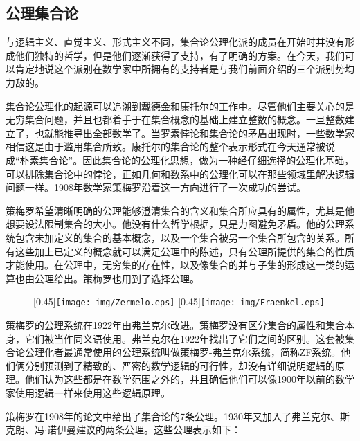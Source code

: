 \documentclass{article}
\begin{document}
\subsection{公理集合论}

与逻辑主义、直觉主义、形式主义不同，集合论公理化派的成员在开始时并没有形成他们独特的哲学，但是他们逐渐获得了支持，有了明确的方案。在今天，我们可以肯定地说这个派别在数学家中所拥有的支持者是与我们前面介绍的三个派别势均力敌的。

集合论公理化的起源可以追溯到戴德金和康托尔的工作中。尽管他们主要关心的是无穷集合问题，并且也都着手于在集合概念的基础上建立整数的概念。一旦整数建立了，也就能推导出全部数学了。当罗素悖论和集合论的矛盾出现时，一些数学家相信这是由于滥用集合所致。康托尔的集合论的整个表示形式在今天通常被说成“朴素集合论”。因此集合论的公理化思想，做为一种经仔细选择的公理化基础，可以排除集合论中的悖论，正如几何和数系中的公理化可以在那些领域里解决逻辑问题一样。1908年数学家策梅罗沿着这一方向进行了一次成功的尝试。

策梅罗希望清晰明确的公理能够澄清集合的含义和集合所应具有的属性，尤其是他想要设法限制集合的大小。他没有什么哲学根据，只是力图避免矛盾。他的公理系统包含未加定义的集合的基本概念，以及一个集合被另一个集合所包含的关系。所有这些加上已定义的概念就可以满足公理中的陈述，只有公理所提供的集合的性质才能使用。在公理中，无穷集的存在性，以及像集合的并与子集的形成这一类的运算也由公理给出。策梅罗也用到了选择公理。

\begin{figure}[htbp]
  \centering
  [0.45\linewidth]{\texttt{[image: img/Zermelo.eps]}} \quad
  [0.45\linewidth]{\texttt{[image: img/Fraenkel.eps]}}
  \captionsetup{labelformat=empty}
  \caption{}
  \label{fig:Zermelo-and-Fraenkel}
\end{figure}

策梅罗的公理系统在1922年由弗兰克尔改进。策梅罗没有区分集合的属性和集合本身，它们被当作同义语使用。弗兰克尔在1922年找出了它们之间的区别。这套被集合论公理化者最通常使用的公理系统叫做策梅罗-弗兰克尔系统，简称ZF系统。他们俩分别预测到了精致的、严密的数学逻辑的可行性，却没有详细说明逻辑的原理。他们认为这些都是在数学范围之外的，并且确信他们可以像1900年以前的数学家使用逻辑一样来使用这些逻辑原理。

策梅罗在1908年的论文中给出了集合论的7条公理。1930年又加入了弗兰克尔、斯克朗、冯$\cdot$诺伊曼建议的两条公理。这些公理表示如下：
\end{document}

